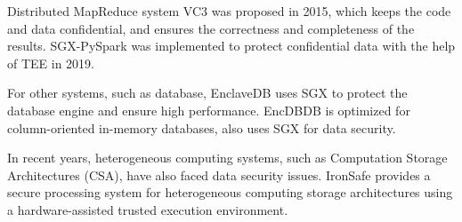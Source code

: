 Distributed MapReduce system VC3 \cite{Schuster2015VC3TD} was proposed in 2015,
which keeps the code and data confidential, and ensures the correctness and completeness of
the results. SGX-PySpark \cite{Quoc2019SGXPySparkSD} was implemented to protect confidential data
with the help of TEE in 2019.

For other systems, such as database, EnclaveDB \cite{Priebe2018EnclaveDBAS} uses SGX to
protect the database engine and ensure high performance.
EncDBDB \cite{Fuhry2021EncDBDBSE} is optimized for column-oriented in-memory databases,
also uses SGX for data security.

In recent years, heterogeneous computing systems, such as Computation Storage Architectures (CSA),
have also faced data security issues.
IronSafe \cite{Unnibhavi2022SecureAP} provides a secure processing system for heterogeneous
computing storage architectures using a hardware-assisted trusted execution environment.
